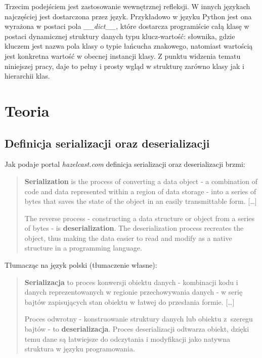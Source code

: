 \documentclass[12pt]{article}
\newcommand{\n}{\newline}
\begin{document}
{		Trzecim podejściem jest zastosowanie wewnętrznej refleksji. W innych językach najczęściej jest dostarczona przez język.
		Przykładowo w języku Python jest ona wyrażona w postaci pola {\it \_\_dict\_\_}, które dostarcza programiście całą klasę
		w postaci dynamicznej struktury danych typu klucz-wartość: słownika, gdzie kluczem jest nazwa pola klasy o typie
		łańcucha znakowego, natomiast wartością jest konkretna wartość w obecnej instancji klasy. Z punktu widzenia tematu
		niniejszej pracy, daje to pełny i prosty wgląd w strukturę zarówno klasy jak i hierarchii klas.
	}

	{
		\section{Teoria}

		{
			\subsection{Definicja serializacji oraz deserializacji}

			Jak podaje portal {\it hazelcast.com}\cite{definitions_serial_and_deserial} definicja serializacji oraz deserializacji brzmi:

			\begin{quotation}
				{\bf Serialization} is the process of converting a data object - a combination of code
				and data represented within a region of data storage - into a series of bytes that
				saves the state of the object in an easily transmittable form. [\ldots]\n

				The reverse process - constructing a data structure or object from a series of
				bytes - is {\bf deserialization}. The deserialization process recreates the object,
				thus making the data easier to read and modify as a native structure in a programming language.
			\end{quotation}

			{\noindent Tłumacząc na język polski (tłumaczenie własne):}

			\begin{quotation}
				{\bf Serializacja} to proces konwersji obiektu danych - kombinacji kodu i danych
				reprezentowanych w regionie przechowywania danych - w serię bajtów zapisujących
				stan obiektu w łatwej do przesłania formie. [\ldots] \n

				Proces odwrotny - konstruowanie struktury danych lub obiektu z~szeregu
				bajtów - to {\bf deserializacja}. Proces deserializacji odtwarza obiekt,
				dzięki temu dane są łatwiejsze do odczytania i modyfikacji jako
				natywna struktura w języku programowania.
			\end{quotation}
		}

}
\end{document}

